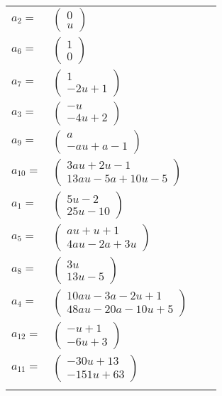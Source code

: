 \documentclass[1p]{elsarticle_modified}
\theoremstyle{definition}
\begin{document}
\begin{tabular}{m{7pt} m{180pt} m{7pt} m{180pt} }
\flushright $a_{2}=$&$\begin{pmatrix}0\\u\end{pmatrix}$ \\
\flushright $a_{6}=$&$\begin{pmatrix}1\\0\end{pmatrix}$ \\
\flushright $a_{7}=$&$\begin{pmatrix}1\\-2 u+1\end{pmatrix}$ \\
\flushright $a_{3}=$&$\begin{pmatrix}- u\\-4 u+2\end{pmatrix}$ \\
\flushright $a_{9}=$&$\begin{pmatrix}a\\- a u+a-1\end{pmatrix}$ \\
\flushright $a_{10}=$&$\begin{pmatrix}3 a u+2 u-1\\13 a u-5 a+10 u-5\end{pmatrix}$ \\
\flushright $a_{1}=$&$\begin{pmatrix}5 u-2\\25 u-10\end{pmatrix}$ \\
\flushright $a_{5}=$&$\begin{pmatrix}a u+u+1\\4 a u-2 a+3 u\end{pmatrix}$ \\
\flushright $a_{8}=$&$\begin{pmatrix}3 u\\13 u-5\end{pmatrix}$ \\
\flushright $a_{4}=$&$\begin{pmatrix}10 a u-3 a-2 u+1\\48 a u-20 a-10 u+5\end{pmatrix}$ \\
\flushright $a_{12}=$&$\begin{pmatrix}- u+1\\-6 u+3\end{pmatrix}$ \\
\flushright $a_{11}=$&$\begin{pmatrix}-30 u+13\\-151 u+63\end{pmatrix}$\\&\end{tabular}
\end{document}
